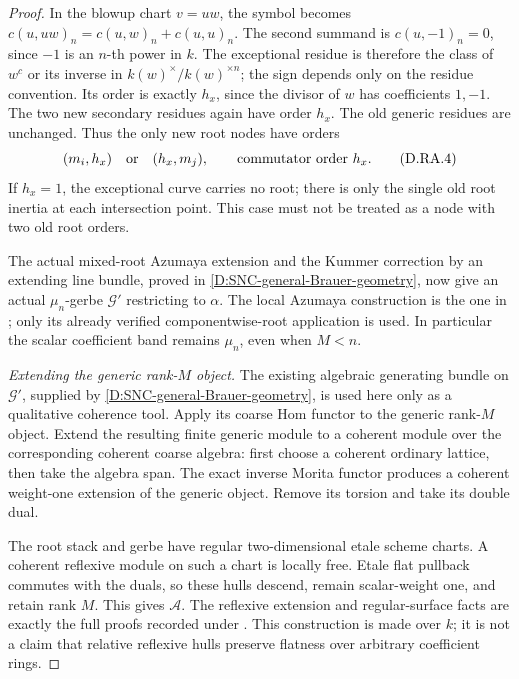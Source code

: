 \begin{proof}
In the blowup chart \(v=uw\), the symbol becomes
\(c(u,uw)_n=c(u,w)_n+c(u,u)_n\).
The second summand is \(c(u,-1)_n=0\), since
\(-1\) is an \(n\)-th power in \(k\).
The exceptional residue is therefore the class of
\(w^{c}\) or its inverse in
\(k(w)^\times/k(w)^{\times n}\); the sign depends only
on the residue convention. Its order is exactly
\(h_x\), since the divisor of \(w\) has coefficients
\(1,-1\). The two new secondary residues again have
order \(h_x\). The old generic residues are unchanged.
Thus the only new root nodes have orders
\[
                    (m_i,h_x)\quad\hbox{or}\quad
                    (h_x,m_j),
 \qquad\hbox{commutator order }h_x.                   \tag{D.RA.4}
\]
If \(h_x=1\), the exceptional curve carries no root;
there is only the single old root inertia at each
intersection point. This case must not be treated
as a node with two old root orders.

The actual mixed-root Azumaya extension and the
Kummer correction by an extending line bundle, proved
in \ref{D:SNC-general-Brauer-geometry}, now give an
actual \(\mu_n\)-gerbe \(\mathcal G'\) restricting to
\(\alpha\). The local Azumaya construction is the
one in \citet[Proposition 3.2.1, complete pp.~10--11]
{Lieblich2011ResidualD}; only its already verified
componentwise-root application is used.
In particular the scalar coefficient band remains
\(\mu_n\), even when \(M<n\).

\emph{Extending the generic rank-\(M\) object.}
The existing algebraic generating bundle on
\(\mathcal G'\), supplied by
\ref{D:SNC-general-Brauer-geometry}, is used here only
as a qualitative coherence tool. Apply its coarse
Hom functor to the generic rank-\(M\) object.
Extend the resulting finite generic module to a
coherent module over the corresponding coherent
coarse algebra: first choose a coherent ordinary
lattice, then take the algebra span.
The exact inverse Morita functor produces a coherent
weight-one extension of the generic object.
Remove its torsion and take its double dual.

The root stack and gerbe have regular two-dimensional
etale scheme charts. A coherent reflexive module on
such a chart is locally free. Etale flat pullback
commutes with the duals, so these hulls descend,
remain scalar-weight one, and retain rank \(M\).
This gives \(\mathcal A\).
The reflexive extension and regular-surface facts
are exactly the full proofs recorded under
\citet[Tag 0AVC, Lemma 15.24.19, and Tag 0B3N,
Lemma 31.13.15]{C_StacksRootAnchorReflexive}.
This construction is made over \(k\); it is not
a claim that relative reflexive hulls preserve
flatness over arbitrary coefficient rings.


\end{proof}
